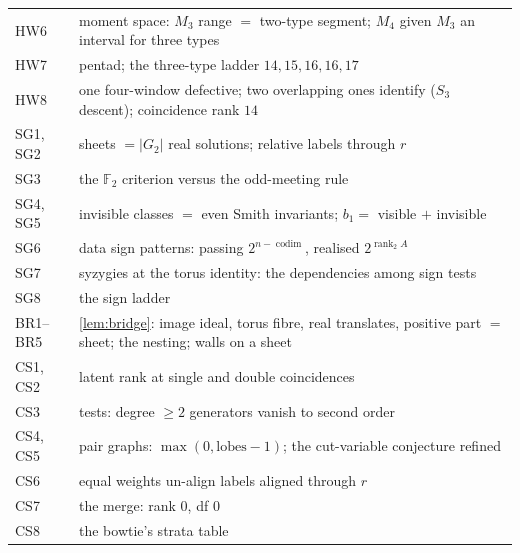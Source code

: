 \documentclass[11pt]{article}
\theoremstyle{definition}\newtheorem{definition}[theorem]{Definition}\newtheorem{remark}[theorem]{Remark}\newtheorem{example}[theorem]{Example}
\begin{document}
\begin{center}
\begin{tabular}{lp{}}
HW6 & moment space: $M_3$ range $=$ two-type segment; $M_4$ given $M_3$ an interval for three types\\
HW7 & pentad; the three-type ladder $14,15,16,16,17$\\
HW8 & one four-window defective; two overlapping ones identify ($S_3$ descent); coincidence rank $14$\\\midrule
SG1, SG2 & sheets $=|G_2|$ real solutions; relative labels through $r$\\
SG3 & the $\mathbb F_2$ criterion versus the odd-meeting rule\\
SG4, SG5 & invisible classes $=$ even Smith invariants; $b_1=$ visible $+$ invisible\\
SG6 & data sign patterns: passing $2^{n-\operatorname{codim}}$, realised $2^{\operatorname{rank}_2A}$\\
SG7 & syzygies at the torus identity: the dependencies among sign tests\\
SG8 & the sign ladder\\\midrule
BR1--BR5 & \cref{lem:bridge}: image ideal, torus fibre, real translates, positive part $=$ sheet; the nesting; walls on a sheet\\\midrule
CS1, CS2 & latent rank at single and double coincidences\\
CS3 & tests: degree $\ge2$ generators vanish to second order\\
CS4, CS5 & pair graphs: $\max(0,\text{lobes}-1)$; the cut-variable conjecture refined\\
CS6 & equal weights un-align labels aligned through $r$\\
CS7 & the merge: rank $0$, df $0$\\
CS8 & the bowtie's strata table\\\bottomrule
\end{tabular}
\end{center}
\end{document}
